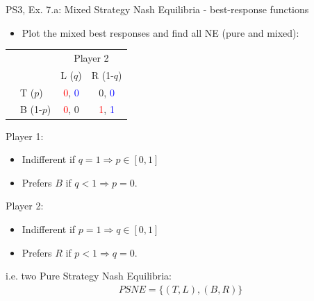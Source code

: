 \begin{frame}{PS3, Ex. 7.a: Mixed Strategy Nash Equilibria - best-response functions}
  \begin{multicols}{2}
    \begin{itemize}
      \item[(a)] Plot the mixed best responses and find all NE (pure and mixed):
    \end{itemize}
    \begin{table}
      \begin{tabular}{cl|c|c|}
        & \multicolumn{1}{c}{} & \multicolumn{2}{c}{\color{blue}Player 2}\\
        \parbox[t]{1mm}{}
          &  &  &  \\
          & T  ($p$)  & \textcolor{red}{0}, \textcolor{blue}{0} & 0, \textcolor{blue}{0} \\
          & B  (1-$p$)& \textcolor{red}{0}, 0 & \textcolor{red}{1}, \textcolor{blue}{1} \\
      \end{tabular}
    \end{table}
    Player 1:
    \begin{itemize}
      \item Indifferent if $q=1\Rightarrow p\in[0,1]$
      \item Prefers $B$ if $q<1\Rightarrow p=0$.
    \end{itemize}
    Player 2:
    \begin{itemize}
      \item Indifferent if $p=1\Rightarrow q\in[0,1]$
      \item Prefers $R$ if $p<1\Rightarrow q=0$.
    \end{itemize}
    i.e. two Pure Strategy Nash Equilibria:
    \begin{align*}
      PSNE=\{(T,L),(B,R)\}
    \end{align*}
  \vfill\null \columnbreak

\end{multicols}
\end{frame}
